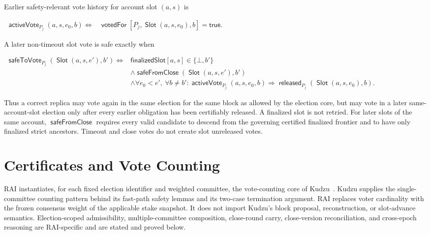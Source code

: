 \documentclass[sigplan,twocolumn,review,anonymous]{acmart}
\newcommand{\func}[1]{\operatorname{\mathsf{#1}}}
\newcommand{\Slot}{\func{Slot}}
\newcommand{\true}{\mathsf{true}}
\newcommand{\finalizedSlot}{\mathsf{finalizedSlot}}
\newcommand{\votedFor}{\func{votedFor}}
\newcommand{\released}{\func{released}}
\newcommand{\safeToVote}{\func{safeToVote}}
\newcommand{\activeVote}{\func{activeVote}}
\newcommand{\safeFromClose}{\func{safeFromClose}}
\begin{document}
Earlier safety-relevant vote history for account slot \((a,s)\) is
\begin{center}
\begin{adjustbox}{max width=\columnwidth}
\(\displaystyle
\begin{aligned}
\activeVote_{P_j}(a,s,e_0,b)
\iff{}& \votedFor[P_j,\Slot(a,s,e_0),b]=\true.
\end{aligned}
\)
\end{adjustbox}
\end{center}
A later non-timeout slot vote is safe exactly when
\begin{center}
\begin{adjustbox}{max width=\columnwidth}
\(\displaystyle
\begin{aligned}
\safeToVote_{P_j}(\Slot(a,s,e'),b')
\iff{}& \finalizedSlot[a,s]\in\{\bot,b'\} \\
&\wedge\safeFromClose(\Slot(a,s,e'),b')\\
&\wedge\forall e_0<e',\ \forall b\neq b':
\activeVote_{P_j}(a,s,e_0,b)\Rightarrow
\released_{P_j}(\Slot(a,s,e_0),b).
\end{aligned}
\)
\end{adjustbox}
\end{center}
Thus a correct replica may vote again in the same election for the same block as allowed by the
election core, but may vote in a later same-account-slot election only after every earlier obligation has been
certifiably released.  A finalized slot is not retried.  For later slots of the same account,
\(\safeFromClose\) requires every valid candidate to descend from the governing certified finalized
frontier and to have only finalized strict ancestors.  Timeout and close votes do not create slot
unreleased votes.

\section{Certificates and Vote Counting}

RAI instantiates, for each fixed election identifier and weighted committee, the vote-counting core of
Kudzu~\cite{shoup2025kudzu}.  Kudzu supplies the single-committee counting pattern behind its
fast-path safety lemmas and its two-case termination argument.  RAI replaces voter cardinality with the
frozen consensus weight of the applicable stake snapshot.  It does not import Kudzu's block proposal,
reconstruction, or slot-advance semantics.  Election-scoped admissibility, multiple-committee
composition, close-round carry, close-version reconciliation, and cross-epoch reasoning are RAI-specific
and are stated and proved below.
\end{document}
